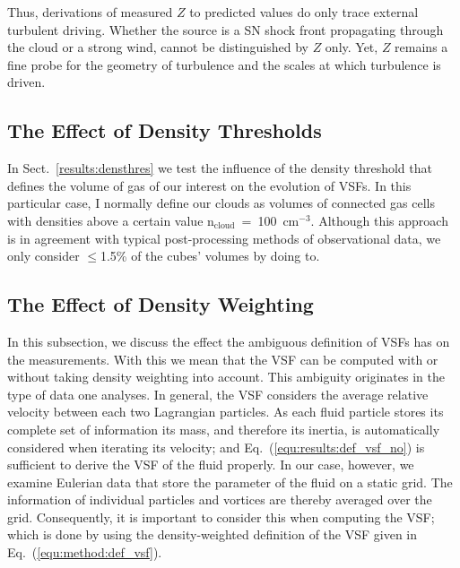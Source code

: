Thus, derivations of measured $Z$ to predicted values do only trace external turbulent driving.
Whether the source is a SN shock front propagating through the cloud or a strong wind, cannot be distinguished by $Z$ only. 
Yet, $Z$ remains a fine probe for the geometry of turbulence and the scales at which turbulence is driven.


\subsection{The Effect of Density Thresholds}\label{discussion:densthres}

In Sect.~\ref{results:densthres} we test the influence of the density threshold that defines the volume of gas of our interest on the evolution of VSFs.
In this particular case, I normally define our clouds as volumes of connected gas cells with densities above a certain value n$_\mathrm{cloud}$~=~100~cm$^{-3}$. 
Although this approach is in agreement with typical post-processing methods of observational data, we only consider $\leq$1.5\% of the cubes' volumes by doing to. 




\subsection{The Effect of Density Weighting}\label{discussion:densweight}

In this subsection, we discuss the effect the ambiguous definition of VSFs has on the measurements. 
With this we mean that the VSF can be computed with or without taking density weighting into account.
This ambiguity originates in the type of data one analyses.
In general, the VSF considers the average relative velocity between each two Lagrangian particles.
As each fluid particle stores its complete set of information its mass, and therefore its inertia, is automatically considered when iterating its velocity; and Eq.~(\ref{equ:results:def_vsf_no}) is sufficient to derive the VSF of the fluid properly.
In our case, however, we examine Eulerian data that store the parameter of the fluid on a static grid. 
The information of individual particles and vortices are thereby averaged over the grid.
Consequently, it is important to consider this when computing the VSF; which is done by using the density-weighted definition of the VSF given in Eq.~(\ref{equ:method:def_vsf}).

